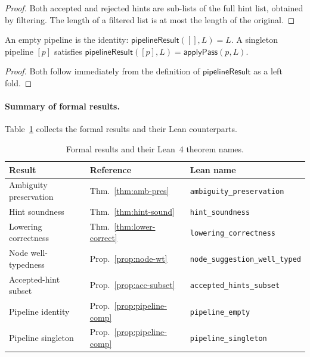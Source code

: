 \documentclass[11pt]{article}
\begin{document}
\begin{proof}
Both accepted and rejected hints are sub-lists of the full hint list,
obtained by filtering.  The length of a filtered list is at most the
length of the original.
\end{proof}

\begin{proposition}\label{prop:pipeline-comp}
An empty pipeline is the identity:
$\mathsf{pipelineResult}([], L) = L$.
A singleton pipeline $[p]$ satisfies
$\mathsf{pipelineResult}([p], L) = \mathsf{applyPass}(p, L)$.
\end{proposition}

\begin{proof}
Both follow immediately from the definition of
$\mathsf{pipelineResult}$ as a left fold.
\end{proof}

\paragraph{Summary of formal results.}
Table~\ref{tab:formal-summary} collects the formal results and their
Lean counterparts.

\begin{table}[t]
\centering
\caption{Formal results and their Lean~4 theorem names.}
\label{tab:formal-summary}
\begin{tabular}{l l l}
\hline
\textbf{Result} & \textbf{Reference} & \textbf{Lean name} \\
\hline
Ambiguity preservation
  & Thm.~\ref{thm:amb-pres}
  & \texttt{ambiguity\_preservation} \\
Hint soundness
  & Thm.~\ref{thm:hint-sound}
  & \texttt{hint\_soundness} \\
Lowering correctness
  & Thm.~\ref{thm:lower-correct}
  & \texttt{lowering\_correctness} \\
Node well-typedness
  & Prop.~\ref{prop:node-wt}
  & \texttt{node\_suggestion\_well\_typed} \\
Accepted-hint subset
  & Prop.~\ref{prop:acc-subset}
  & \texttt{accepted\_hints\_subset} \\
Pipeline identity
  & Prop.~\ref{prop:pipeline-comp}
  & \texttt{pipeline\_empty} \\
Pipeline singleton
  & Prop.~\ref{prop:pipeline-comp}
  & \texttt{pipeline\_singleton} \\
\hline
\end{tabular}
\end{table}
\end{document}
